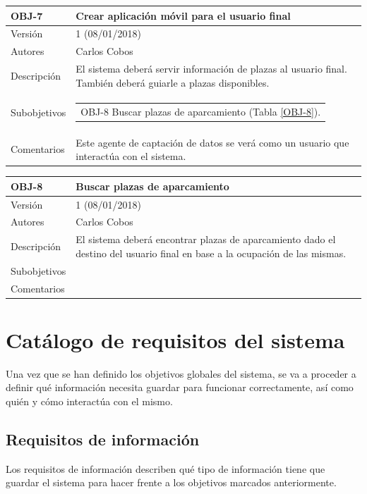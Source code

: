 \begin{tabularx}{\textwidth}{|l|X|}
	\caption{Objetivo 7 del sistema}\label{OBJ-7}\\
	\hline
	OBJ-7        & Crear aplicación móvil para el usuario final \\ \hline
	Versión      & 1 (08/01/2018) \\ \hline
	Autores      & Carlos Cobos \\ \hline
	Descripción  & El sistema deberá servir información de plazas al usuario final. También deberá guiarle a plazas disponibles. \\ \hline
	Subobjetivos & 	\begin{tabular}{@{}X@{}}
		OBJ-8 Buscar plazas de aparcamiento (Tabla \ref{OBJ-8}).
	\end{tabular} \\ \hline
	Comentarios  & Este agente de captación de datos se verá como un usuario que interactúa con el sistema. \\ \hline
\end{tabularx}

\begin{tabularx}{\textwidth}{|l|X|}
	\caption{Objetivo 8 del sistema}\label{OBJ-8}\\
	\hline
	OBJ-8        & Buscar plazas de aparcamiento \\ \hline
	Versión      & 1 (08/01/2018) \\ \hline
	Autores      & Carlos Cobos \\ \hline
	Descripción  & El sistema deberá encontrar plazas de aparcamiento dado el destino del usuario final en base a la ocupación de las mismas. \\ \hline
	Subobjetivos & \\ \hline
	Comentarios  & \\ \hline
\end{tabularx}

\newpage
\section{Catálogo de requisitos del sistema}
Una vez que se han definido los objetivos globales del sistema, se va a proceder a definir qué información necesita guardar para funcionar correctamente, así como quién y cómo interactúa con el mismo.

\subsection{Requisitos de información}
Los requisitos de información describen qué tipo de información tiene que guardar el sistema para hacer frente a los objetivos marcados anteriormente. \\

